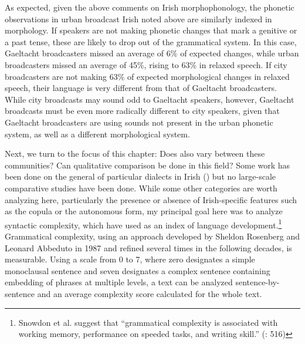 \documentclass[output=paper,colorlinks,citecolor=brown]{langscibook}
\begin{document}
As expected, given the above comments on Irish morphophonology, the phonetic observations in urban broadcast Irish noted above are similarly indexed in morphology. If speakers are not making phonetic changes that mark a genitive or a past tense, these are likely to drop out of the grammatical system. In this case, Gaeltacht broadcasters missed an average of 6\% of expected changes, while urban broadcasters missed an average of 45\%, rising to 63\% in relaxed speech. If city broadcasters are not making 63\% of expected morphological changes in relaxed speech, their language is very different from that of Gaeltacht broadcasters. While city broadcasts may sound odd to Gaeltacht speakers, however, Gaeltacht broadcasts must be even more radically different to city speakers, given that Gaeltacht broadcasters are using sounds not present in the urban phonetic system, as well as a different morphological system.

Next, we turn to the focus of this chapter: Does  also vary between these communities? Can qualitative comparison be done in this field? Some work has been done on the general  of particular  dialects in Irish (\cite{ob:OSiadhail1989, ob:OMuiri1982}) but no large-scale comparative studies have been done. While some other categories are worth analyzing here, particularly the presence or absence of Irish-specific features such as the copula or the autonomous form, my principal goal here was to analyze syntactic complexity, which \cite{ob:Snowdon1996} have used as an index of language development.\footnote{Snowdon et al. suggest that ``grammatical complexity is associated with working memory, performance on speeded tasks, and writing skill.” (\cite{ob:Snowdon1996}: 516)} Grammatical complexity, using an approach developed by Sheldon Rosenberg and Leonard Abbeduto in 1987 and refined several times in the following decades, is measurable. Using a scale from 0 to 7, where zero designates a simple monoclausal sentence and seven designates a complex sentence containing embedding of phrases at multiple levels, a text can be analyzed sentence-by-sentence and an average complexity score calculated for the whole text.
\end{document}
